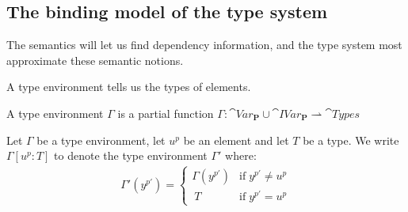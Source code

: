\documentclass{llncs}
\begin{document}
\subsection{The binding model of the type system}\label{sec:basis}

The semantics will let us find dependency information, and the type 
system most approximate these semantic notions.





A type environment tells us the types of elements.

\begin{definition}
  A type environment $\Gamma$ is a partial function $\Gamma:\cat{Var}_{\mathbf{P}}\cup\cat{IVar}_{\mathbf{P}}\rightharpoonup\cat{Types}$
\end{definition}

\begin{definition}
	Let $\Gamma$ be a type environment, let $u^p$ be an element
        and let $T$ be a type.
	We write $\Gamma[u^p:T]$ to denote the type environment $\Gamma'$ where:
	\begin{align*}
		\Gamma'(y^{p'})=
		\left\{\begin{matrix}
			\Gamma(y^{p'}) & \mbox{if}\;y^{p'}\neq u^{p}\\\	 
			T & \mbox{if}\;y^{p'}=u^{p}
		\end{matrix}\right.
	\end{align*}
\end{definition}
\end{document}
